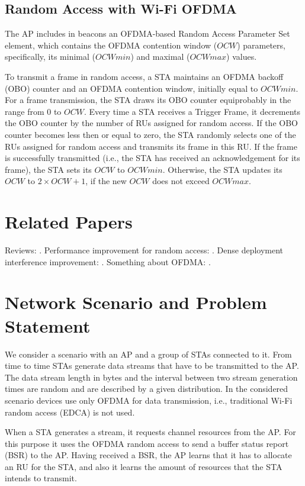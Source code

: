 \subsection{Random Access with Wi-Fi OFDMA}
The AP includes in beacons an OFDMA-based Random Access Parameter Set element, which contains the OFDMA contention window ($OCW$) parameters, specifically, its minimal ($OCWmin$) and maximal ($OCWmax$) values.

To transmit a frame in random access, a STA maintains an OFDMA backoff (OBO) counter and an OFDMA contention window, initially equal to $OCWmin$.
For a frame transmission, the STA draws its OBO counter equiprobably in the range from $0$ to $OCW$.
Every time a STA receives a Trigger Frame, it decrements the OBO counter by the number of RUs assigned for random access.
If the OBO counter becomes less then or equal to zero, the STA randomly selects one of the RUs assigned for random access and transmits its frame in this RU.
If the frame is successfully transmitted (i.e., the STA has received an acknowledgement for its frame), the STA sets its $OCW$ to $OCWmin$.
Otherwise, the STA updates its $OCW$ to $2 \times OCW + 1$, if the new $OCW$ does not exceed $OCWmax$.

\section{Related Papers}
Reviews: \cite{khorov2015ieee, bellalta2016ieee}.
Performance improvement for random access: \cite{khorov2016several}.
Dense deployment interference improvement: \cite{khorov2016joint}.
Something about OFDMA: \cite{qu2015ofdma}.

\section{Network Scenario and Problem Statement}
We consider a scenario with an AP and a group of STAs connected to it.
From time to time STAs generate data streams that have to be transmitted to the AP.
The data stream length in bytes and the interval between two stream generation times are random and are described by a given distribution.
In the considered scenario devices use only OFDMA for data transmission, i.e., traditional Wi-Fi random access (EDCA) is not used.

When a STA generates a stream, it requests channel resources from the AP.
For this purpose it uses the OFDMA random access to send a buffer status report (BSR) to the AP.
Having received a BSR, the AP learns that it has to allocate an RU for the STA, and also it learns the amount of resources that the STA intends to transmit.

